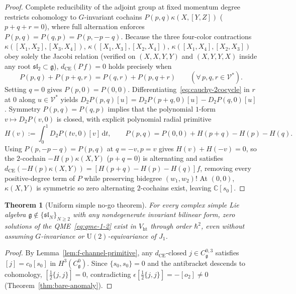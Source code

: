\documentclass[11pt,letterpaper]{article}
\numberwithin{equation}{section}
\theoremstyle{plain}
\newtheorem{theorem}{Theorem}[section]
\theoremstyle{definition}
\theoremstyle{remark}
\newcommand{\dd}{\mathrm{d}}
\newcommand{\fg}{\mathfrak{g}}
\newcommand{\fsl}{\mathfrak{sl}}
\newcommand{\Vht}{V_{\mathrm{ht}}}
\newcommand{\Cg}{C^0_{\fg}}
\begin{document}
\begin{proof}
Complete reducibility of the adjoint group at fixed momentum degree restricts cohomology to $G$-invariant cochains $P(p,q)\kappa(X,[Y,Z])$ ($p + q + r = 0$), where full alternation enforces $P(p,q) = P(q,p) = P(p, -p-q)$. Because the three four-color contractions $\kappa([X_1,X_2],[X_3,X_4])$, $\kappa([X_1,X_3],[X_2,X_4])$, $\kappa([X_1,X_4],[X_2,X_3])$ obey solely the Jacobi relation (verified on $(X,X,Y,Y)$ and $(X,Y,Y,X)$ inside any root $\fsl_2 \subset \fg$), $d_{\mathrm{CE}}(P\,f) = 0$ holds precisely when
\begin{equation}
\label{eq:cauchy-2cocycle}
P(p, q) + P(p + q, r) = P(q, r) + P(p, q + r) \qquad (\forall\,p, q, r \in \mathcal{V}^*).
\end{equation}
Setting $q = 0$ gives $P(p,0) = P(0,0)$. Differentiating~\eqref{eq:cauchy-2cocycle} in $r$ at $0$ along $u \in \mathcal{V}^*$ yields $D_2 P(p,q)[u] = D_2 P(p+q,0)[u] - D_2 P(q,0)[u]$. Symmetry $P(p,q) = P(q,p)$ implies that the polynomial $1$-form $v \mapsto D_2 P(v,0)$ is closed, with explicit polynomial radial primitive
\begin{equation}
\label{eq:radial-H}
H(v) := \int_0^1 D_2 P(tv, 0)[v]\,\dd t, \qquad P(p, q) = P(0,0) + H(p+q) - H(p) - H(q).
\end{equation}
Using $P(p, -p-q) = P(p,q)$ at $q = -v, p = v$ gives $H(v) + H(-v) = 0$, so the $2$-cochain $-H(p)\kappa(X,Y)$ ($p+q=0$) is alternating and satisfies $d_{\mathrm{CE}}(-H(p)\kappa(X,Y)) = [H(p+q)-H(p)-H(q)]f$, removing every positive-degree term of $P$ while preserving bidegree $(w_1,w_2)$! At $(0,0)$, $\kappa(X,Y)$ is symmetric so zero alternating $2$-cochains exist, leaving $\mathbb{C}[s_0]$.
\end{proof}

\begin{theorem}[Uniform simple no-go theorem]
\label{thm:uniform-nogo}
For every complex simple Lie algebra $\fg \notin \{\fsl_N\}_{N\ge 2}$ with any nondegenerate invariant bilinear form, zero solutions of the QME~\eqref{eq:qme-1-2} exist in $\Vht$ through order $\hbar^2$, even without assuming $G$-invariance or $\mathrm{U}(2)$-equivariance of $J_1$.
\end{theorem}

\begin{proof}
By Lemma~\ref{lem:f-channel-primitive}, any $d_{\mathrm{CE}}$-closed $j \in C^{0,3}_{\fg}$ satisfies $[j] = c_0[s_0]$ in $H^3(\Cg)$. Since $\{s_0, s_0\} = 0$ and the antibracket descends to cohomology, $[\frac{1}{2}\{j, j\}] = 0$, contradicting $\epsilon[\frac{1}{2}\{j,j\}] = -[o_2] \neq 0$ (Theorem~\ref{thm:bare-anomaly}).
\end{proof}
\end{document}
